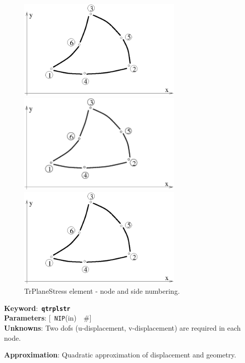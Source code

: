 \documentclass[a4paper]{article}
\newcommand{\descitem}[1]{{\noindent \bf #1}:}
\newcommand{\elemkeyword}[1]{\descitem{Keyword}~{\bf \texttt{#1}}}
\newcommand{\elemparam}[2]{{{\texttt{#1}\tiny (#2)}~~\#}}
\newcommand{\optelemparam}[2]{{[~\elemparam{#1}{#2}]}}
\begin{document}
\begin{figure}[htb]
\begin{htmlonly}
  \centerline{\includegraphics[width=0.7\textwidth]{qtrplanstrss.eps}}
\end{htmlonly}
\ifpdf
\centerline{\includegraphics[width=0.7\textwidth]{qtrplanstrss.pdf}}
\else
\centerline{\includegraphics[width=0.7\textwidth]{qtrplanstrss.eps}}
\fi
\caption{TrPlaneStress element - node and side numbering.}
\label{qtrplanstressfig}
\end{figure}

\elemkeyword{qtrplstr}\\
\descitem{Parameters} \optelemparam{NIP}{in}\\
\descitem{Unknowns}
Two dofs (u-displacement, v-displacement) are required in each node.

\descitem{Approximation} Quadratic approximation of displacement and
geometry.
\end{document}
